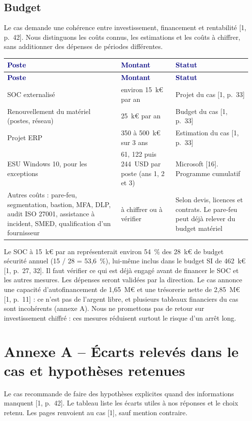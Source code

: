 \documentclass[11pt,a4paper]{article}
\newcommand{\thd}[1]{\textbf{\textcolor{navy}{#1}}}
\begin{document}
\subsection*{Budget}
Le cas demande une cohérence entre investissement, financement et rentabilité [1, p.~42]. Nous distinguons les coûts connus, les estimations et les coûts à chiffrer, sans additionner des dépenses de périodes différentes.

\begin{xltabular}{\linewidth}{@{}YP{45mm}P{48mm}@{}}\toprule
\thd{Poste} & \thd{Montant} & \thd{Statut}\\\midrule\endfirsthead
\toprule \thd{Poste} & \thd{Montant} & \thd{Statut}\\\midrule\endhead
\bottomrule\endfoot
SOC externalisé & environ 15~k€ par an & Projet du cas [1, p.~33]\\
Renouvellement du matériel (postes, réseau) & 25~k€ par an & Budget du cas [1, p.~33]\\
Projet ERP & 350 à 500~k€ sur 3 ans & Estimation du cas [1, p.~33]\\
ESU Windows 10, pour les exceptions & 61, 122 puis 244~USD par poste (ans 1, 2 et 3) & Microsoft [16]. Programme cumulatif\\
Autres coûts : pare-feu, segmentation, bastion, MFA, DLP, audit ISO 27001, assistance à incident, SMED, qualification d'un fournisseur & à chiffrer ou à vérifier & Selon devis, licences et contrats. Le pare-feu peut déjà relever du budget matériel\\
\end{xltabular}

Le SOC à 15~k€ par an représenterait environ 54~\% des 28~k€ de budget sécurité annuel (15 / 28 = 53,6~\%), lui-même inclus dans le budget SI de 462~k€ [1, p.~27, 32]. Il faut vérifier ce qui est déjà engagé avant de financer le SOC et les autres mesures. Les dépenses seront validées par la direction. Le cas annonce une capacité d'autofinancement de 1,65~M€ et une trésorerie nette de 2,85~M€ [1, p.~11] : ce n'est pas de l'argent libre, et plusieurs tableaux financiers du cas sont incohérents (annexe A). Nous ne promettons pas de retour sur investissement chiffré : ces mesures réduisent surtout le risque d'un arrêt long.

\section*{Annexe A -- Écarts relevés dans le cas et hypothèses retenues}
Le cas recommande de faire des hypothèses explicites quand des informations manquent [1, p.~42]. Le tableau liste les écarts utiles à nos réponses et le choix retenu. Les pages renvoient au cas [1], sauf mention contraire.
\end{document}
